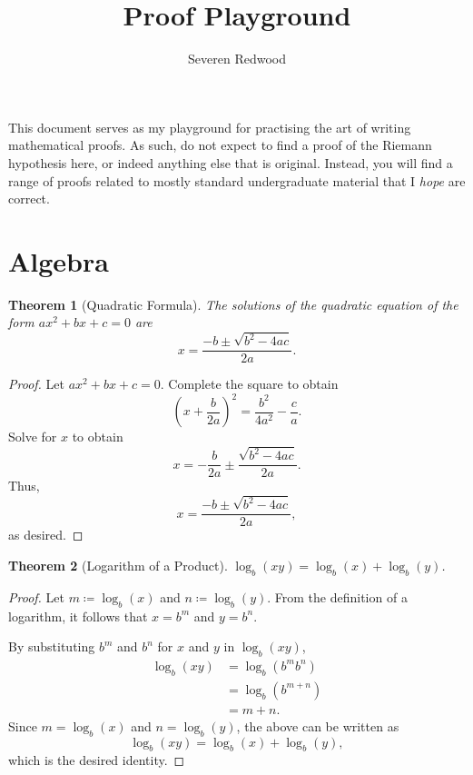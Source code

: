 \documentclass[headings=standardclasses]{scrartcl}
\title{Proof Playground}
\author{Severen Redwood}
\date{}
\newtheorem{theorem}{Theorem}[subsection]
\theoremstyle{definition}
\begin{document}
\maketitle

\noindent This document serves as my playground for practising the art of
writing mathematical proofs. As such, do not expect to find a proof of the
Riemann hypothesis here, or indeed anything else that is original. Instead, you
will find a range of proofs related to mostly standard undergraduate material
that I \textit{hope} are correct.

\tableofcontents

\section{Algebra}

\begin{theorem}[Quadratic Formula]
  The solutions of the quadratic equation of the form \(ax^2 + bx + c = 0\) are
  \[ x = \frac{-b ±\sqrt{b^2 - 4ac}}{2a}. \]
\end{theorem}

\begin{proof}
  Let \(ax^{2} + bx + c = 0\). Complete the square to obtain
  \begin{equation*}
    {\left(x + \frac{b}{2a}\right)}^2 = \frac{b^{2}}{4a^{2}} - \frac{c}{a}.
  \end{equation*}
  Solve for \(x\) to obtain
  \begin{equation*}
    x = -\frac{b}{2a} ±\frac{\sqrt{b^2 - 4ac}}{2a}.
  \end{equation*}
  Thus,
  \begin{equation*}
    x = \frac{-b ± \sqrt{b^2 - 4ac}}{2a},
  \end{equation*}
  as desired.
\end{proof}

\begin{theorem}[Logarithm of a Product]
  \(\displaystyle \log_{b}(xy) = \log_{b}(x) + \log_{b}(y)\).
\end{theorem}

\begin{proof}
  Let \(m ≔ \log_b(x)\) and \(n ≔ \log_b(y)\). From the definition of a
  logarithm, it follows that \(x = b^m\) and \(y = b^n\).

  By substituting \(b^m\) and \(b^n\) for \(x\) and \(y\) in \(\log_b(xy)\),
  \begin{equation*}
  \begin{split}
    \log_b(xy) &= \log_b(b^{m}b^{n}) \\
               &= \log_b(b^{m + n}) \\
               &= m + n.
  \end{split}
  \end{equation*}
  Since \(m = \log_b(x)\) and \(n = \log_b(y)\), the above can be written as
  \begin{equation*}
    \log_b(xy) = \log_b(x) + \log_b(y),
  \end{equation*}
  which is the desired identity.
\end{proof}
\end{document}
